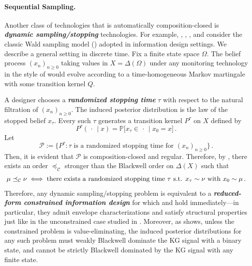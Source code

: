 \documentclass[12pt,letterpaper]{article}
\newenvironment{original}{\color{black}}{}
\theoremstyle{plain}
\theoremstyle{definition}
\theoremstyle{remark}
\renewcommand{\P}{\mathds{P}}
\newcommand{\C}{\mathcal{C}}
\theoremstyle{definition}
\begin{document}
\paragraph{Sequential Sampling.}\hspace{-2mm}
\begin{original}
Another class of technologies that is automatically composition-closed is \textit{\textbf{dynamic sampling/stopping}} technologies. For example, \citet{brocas2007influence}, \citet{henry2019research}, \citet{morris2019wald}, and \citet{ball2021experimental} consider the classic Wald sampling model (\citealt{Wald}) adopted in information design settings. We describe a general setting in discrete time. Fix a finite state space $\Omega$. The belief process $(x_n)_{n \geq 0}$ taking values in $X = \Delta(\Omega)$ under any monitoring technology in the style of \citet{Wald} would evolve according to a time-homogeneous Markov martingale with some transition kernel $Q$.

A designer chooses a \textit{\textbf{randomized stopping time}} $\tau$ with
respect to the natural filtration of $(x_n)_{n \geq 0}$. The induced posterior distribution is the law of the stopped belief $x_\tau$. Every such $\tau$ generates a transition kernel $P^\tau$ on $X$ defined by
\[P^\tau(\,\cdot\, \mid x) = \P\big[x_\tau \in \,\cdot\, \mid x_0 = x\big]\,.\]
Let
\[\mathcal{P} := \Big\{P^\tau: \tau \text{ is a randomized stopping time for $(x_n)_{n\geq 0}$}\Big\}\,.\]
Then, it is evident that $\mathcal{P}$ is composition-closed and regular. Therefore, by , there exists an order $\preceq_\C$ stronger than the Blackwell order on $\Delta(X)$ such that
\[\mu \preceq_\C \nu \iff \text{there exists a randomized stopping time $\tau$ s.t. $x_\tau  \sim \nu$ with $x_0 \sim \mu$\,.}\]
Therefore, any dynamic sampling/stopping problem is equivalent to a \textit{\textbf{reduced-form constrained information design}} for which  and  hold immediately---in particular, they admit envelope characterizations and satisfy structural properties just like in the unconstrained case studied in \citet{Kamenica2011}. Moreover, as  shows, unless the constrained problem is value-eliminating,  the induced posterior distributions for any such problem must weakly Blackwell dominate the KG signal with a binary state, and cannot be strictly Blackwell dominated by the KG signal with any finite state.


\end{original}
\end{document}
